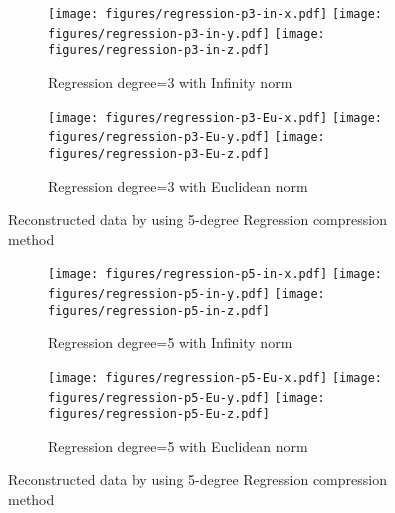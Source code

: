 \begin{figure*}
\centering
\begin{subfigure}{\columnwidth}
\centering
\texttt{[image: figures/regression-p3-in-x.pdf]}
\texttt{[image: figures/regression-p3-in-y.pdf]}
\texttt{[image: figures/regression-p3-in-z.pdf]}
\caption{Regression degree=3 with Infinity norm}
\end{subfigure}

\centering
\begin{subfigure}{\columnwidth}
\centering
\texttt{[image: figures/regression-p3-Eu-x.pdf]}
\texttt{[image: figures/regression-p3-Eu-y.pdf]}
\texttt{[image: figures/regression-p3-Eu-z.pdf]}
\caption{Regression degree=3 with Euclidean norm}
\end{subfigure}

\caption{Reconstructed data by using 5-degree Regression compression method}
\label{fig:poly-regression-3-degree}
\end{figure*}


\begin{figure*}
\centering
\begin{subfigure}{\columnwidth}
\centering
\texttt{[image: figures/regression-p5-in-x.pdf]}
\texttt{[image: figures/regression-p5-in-y.pdf]}
\texttt{[image: figures/regression-p5-in-z.pdf]}
\caption{Regression degree=5 with Infinity norm}
\end{subfigure}

\centering
\begin{subfigure}{\columnwidth}
\centering
\texttt{[image: figures/regression-p5-Eu-x.pdf]}
\texttt{[image: figures/regression-p5-Eu-y.pdf]}
\texttt{[image: figures/regression-p5-Eu-z.pdf]}
\caption{Regression degree=5 with Euclidean norm}
\end{subfigure}

\caption{Reconstructed data by using 5-degree Regression compression method}
\label{fig:poly-regression-5-degree}
\end{figure*}

